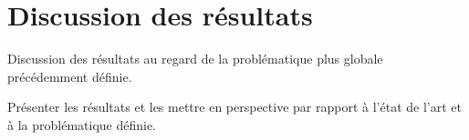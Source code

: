 \chapter{Discussion des résultats}
\label{sec:discussion}

Discussion des résultats au regard de la problématique plus globale précédemment définie.
 
Présenter les résultats et les mettre en perspective par rapport à l'état de l'art et à la problématique définie.\\
 
 

\lipsum[1-2]
